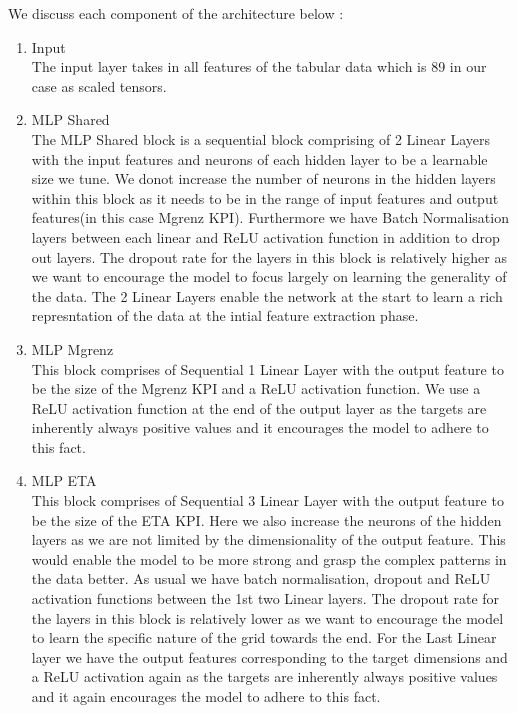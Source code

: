 \documentclass{report} %
\begin{document}
We discuss each component of the architecture below :
\begin{enumerate}
    \item Input \\
    The input layer takes in all features of the tabular data which is 89 in our case as scaled tensors.
    \item MLP Shared \\
    The MLP Shared block is a sequential block comprising of 2 Linear Layers with the input features and neurons of each hidden layer to be a learnable size we tune.
    We donot increase the number of neurons in the hidden layers within this block as it needs to be in the range of input features and output features(in this case Mgrenz \ac{KPI}).
    Furthermore we have Batch Normalisation layers between each linear and \ac{ReLU} activation function in addition to drop out layers.
    The dropout rate for the layers in this block is relatively higher as we want to encourage the model to focus largely on learning the generality of the data.
    The 2 Linear Layers enable the network at the start to learn a rich represntation of the data at the intial feature extraction phase.
    \item MLP Mgrenz \\
    This block comprises of Sequential 1 Linear Layer with the output feature to be the size of the Mgrenz \ac{KPI} and a \ac{ReLU} activation function.
    We use a \ac{ReLU} activation function at the end of the output layer as the targets are inherently always positive values and it encourages the model to adhere to this fact.
    \item MLP ETA \\
    This block comprises of Sequential 3 Linear Layer with the output feature to be the size of the ETA \ac{KPI}.
    Here we also increase the neurons of the hidden layers as we are not limited by the dimensionality of the output feature.
    This would enable the model to be more strong and grasp the complex patterns in the data better.
    As usual we have batch normalisation, dropout and \ac{ReLU} activation functions between the 1st two Linear layers.
    The dropout rate for the layers in this block is relatively lower as we want to encourage the model to learn the specific nature of the grid towards the end.
    For the Last Linear layer we have the output features corresponding to the target dimensions and a \ac{ReLU} activation again as the targets are inherently always positive values and it again encourages the model to adhere to this fact.

\end{enumerate}
\end{document}
